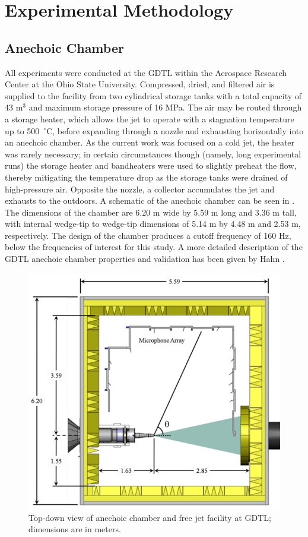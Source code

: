 \chapter{Experimental Methodology}
\label{methodology}

\section{Anechoic Chamber}
All experiments were conducted at the GDTL within the Aerospace Research Center at the Ohio State University. 
Compressed, dried, and filtered air is supplied to the facility from two cylindrical storage tanks with a total capacity of 43 m$^{3}$ and maximum storage pressure of 16 MPa.
The air may be routed through a storage heater, which allows the jet to operate with a stagnation temperature up to 500~$^\circ$C, before expanding through a nozzle and exhausting horizontally into an anechoic chamber. 
As the current work was focused on a cold jet, the heater was rarely necessary; in certain circumstances though (namely, long experimental runs) the storage heater and bandheaters were used to slightly preheat the flow, thereby mitigating the temperature drop as the storage tanks were drained of high-pressure air.
Opposite the nozzle, a collector accumulates the jet and exhausts to the outdoors. 
A schematic of the anechoic chamber can be seen in . 
The dimensions of the chamber are 6.20 m wide by 5.59 m long and 3.36 m tall, with internal wedge-tip to wedge-tip dimensions of 5.14 m by 4.48 m and 2.53 m, respectively. 
The design of the chamber produces a cutoff frequency of 160 Hz, below the frequencies of interest for this study. 
A more detailed description of the GDTL anechoic chamber properties and validation has been given by Hahn \citep{Hahn2011}.
\begin{figure}
	\centering
	\includegraphics{Figures/Chamber_Schematic.png}
	\caption{Top-down view of anechoic chamber and free jet facility at GDTL; dimensions are in meters.} 
	\label{fig:chamber}
\end{figure}

